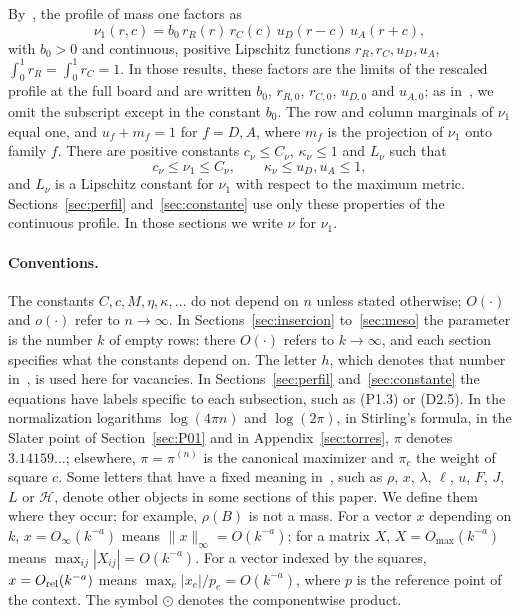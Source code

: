 By~\cite[Theorems~1.2 and~1.3 and Proposition~5.2]{Perfil}, the profile of mass one factors as
\begin{equation}\label{eq:factorizacion}
 \nu_1(r,c)=b_0\,r_R(r)\,r_C(c)\,u_D(r-c)\,u_A(r+c),
\end{equation}
with $b_0>0$ and continuous, positive Lipschitz functions $r_R,r_C,u_D,u_A$, $\int_0^1r_R=\int_0^1r_C=1$.
In those results, these factors are the limits of the rescaled profile at the full board and
are written $b_0$, $r_{R,0}$, $r_{C,0}$, $u_{D,0}$ and $u_{A,0}$; as in~\cite{Completabilidad},
we omit the subscript except in the constant $b_0$.
The row and column marginals of $\nu_1$ equal one, and $u_f+m_f=1$ for $f=D,A$, where
$m_f$ is the projection of $\nu_1$ onto family $f$. There are positive constants
$c_\nu\le C_\nu$, $\kappa_\nu\le1$ and $L_\nu$ such that
\[
 c_\nu\le\nu_1\le C_\nu,\qquad \kappa_\nu\le u_D,u_A\le1,
\]
and $L_\nu$ is a Lipschitz constant for $\nu_1$ with respect to the maximum metric.
Sections~\ref{sec:perfil}
and~\ref{sec:constante} use only these properties of the continuous profile. In those sections we write
$\nu$
for $\nu_1$.

\paragraph{Conventions.}
The constants $C,c,M,\eta,\kappa,\dots$ do not depend on $n$ unless stated otherwise;
$O(\cdot)$ and $o(\cdot)$ refer to $n\to\infty$. In Sections~\ref{sec:insercion}
to~\ref{sec:meso} the parameter is the number $k$ of empty rows: there $O(\cdot)$ refers to
$k\to\infty$, and each section specifies what the constants depend on. The letter $h$, which
denotes that number in~\cite{Completabilidad}, is used here for vacancies. In Sections~\ref{sec:perfil}
and~\ref{sec:constante} the equations have labels specific to each subsection, such as (P1.3) or (D2.5).
In the normalization logarithms $\log(4\pi n)$ and $\log(2\pi)$, in Stirling's formula, in the
Slater point of Section~\ref{sec:P01} and in Appendix~\ref{sec:torres}, $\pi$ denotes
$3.14159\ldots$; elsewhere, $\pi=\pi^{(n)}$ is the canonical maximizer and $\pi_c$ the weight of
square $c$. Some letters that have a fixed meaning in~\cite{Perfil}, such as $\rho$, $x$, $\lambda$,
$\ell$, $u$, $F$, $J$, $L$ or $\mathcal H$, denote other objects in some sections of this paper.
We define them where they occur; for example, $\rho(B)$ is not a mass.
For a vector $x$ depending on $k$, $x=O_\infty(k^{-a})$ means $\|x\|_\infty=O(k^{-a})$; for a matrix
$X$, $X=O_{\max}(k^{-a})$ means $\max_{ij}|X_{ij}|=O(k^{-a})$. For a vector indexed by the squares,
$x=O_{\rm rel}(k^{-a})$ means $\max_e|x_e|/p_e=O(k^{-a})$, where $p$ is the reference point of the
context. The symbol $\odot$ denotes the componentwise product.


